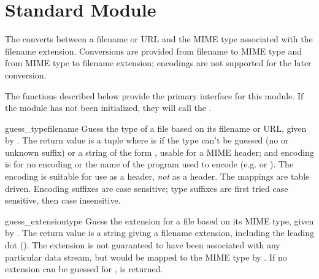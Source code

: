 
\section{Standard Module }



The  converts between a filename or URL and the MIME
type associated with the filename extension.  Conversions are provided 
from filename to MIME type and from MIME type to filename extension;
encodings are not supported for the later conversion.

The functions described below provide the primary interface for this
module.  If the module has not been initialized, they will call the
.


\begin{funcdesc}{guess_type}{filename}
Guess the type of a file based on its filename or URL, given by
.
The return value is a tuple  where
 is  if the type can't be guessed (no or unknown
suffix) or a string of the form ,
usable for a MIME  header; and 
encoding is  for no encoding or the name of the program used
to encode (e.g.  or ).  The encoding
is suitable for use as a  header,
\emph{not} as a  header.  The mappings
are table driven.  Encoding suffixes are case sensitive; type suffixes
are first tried case sensitive, then case insensitive.
\end{funcdesc}

\begin{funcdesc}{guess_extension}{type}
Guess the extension for a file based on its MIME type, given by
.
The return value is a string giving a filename extension, including the
leading dot ().  The extension is not guaranteed to have been
associated with any particular data stream, but would be mapped to the 
MIME type  by .  If no extension can
be guessed for ,  is returned.
\end{funcdesc}


